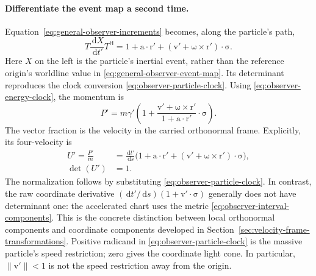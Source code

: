\documentclass[11pt]{article}
\newcommand{\pv}[1]{{#1}}
\newcommand{\vstyle}[1]{{\bm{\mathrm{#1}}}}
\newcommand{\pP}{\pv{P}}
\newcommand{\pT}{\pv{T}}
\newcommand{\pU}{\pv{U}}
\newcommand{\pX}{\pv{X}}
\numberwithin{equation}{section}
\newcommand{\dotprod}{\cdot}
\newcommand{\bsig}{\vstyle{\sigma}}
\newcommand{\br}{\vstyle{r}}
\newcommand{\bv}{\vstyle{v}}
\newcommand{\ba}{\vstyle{a}}
\newcommand{\dd}{\,\mathrm d}
\begin{document}
\paragraph{Differentiate the event map a second time.}
Equation~\eqref{eq:general-observer-increments}
becomes, along the particle's path,
\begin{equation}
 \pT\frac{\dd\pX}{\dd t'}\pT^{\mathsf H}
 =1+\ba\dotprod\br'
  +(\bv'+\vstyle{\omega}\times\br')\dotprod\bsig.
 \label{eq:observer-path-tangent}
\end{equation}
Here $\pX$ on the left is the particle's inertial event, rather than
the reference origin's worldline value in
\eqref{eq:general-observer-event-map}. Its determinant reproduces
the clock conversion \eqref{eq:observer-particle-clock}. Using
\eqref{eq:observer-energy-clock}, the momentum is
\begin{equation}
 \pP'=m\gamma'\left(1+
       \frac{\bv'+\vstyle{\omega}\times\br'}{1+\ba\dotprod\br'}
       \dotprod\bsig\right).
 \label{eq:observer-particle-momentum}
\end{equation}
The vector fraction is the velocity in the carried orthonormal frame.
Explicitly, its four-velocity is
\begin{equation}
 \boxed{\begin{aligned}
 \pU'=\frac{\pP'}{m}
 &=\frac{\dd t'}{\dd s}
 \bigl(1+\ba\dotprod\br'
       +(\bv'+\vstyle{\omega}\times\br')\dotprod\bsig\bigr),\\
 \det(\pU')&=1.
 \end{aligned}}
 \label{eq:observer-particle-four-velocity}
\end{equation}
The normalization follows by substituting
\eqref{eq:observer-particle-clock}. In contrast, the raw coordinate
derivative $(\dd t'/\dd s)(1+\bv'\dotprod\bsig)$ generally does
not have determinant one: the accelerated chart uses the metric
\eqref{eq:observer-interval-components}. This is the concrete
distinction between local orthonormal components and coordinate
components developed in Section~\ref{sec:velocity-frame-transformations}.
Positive radicand in \eqref{eq:observer-particle-clock} is the massive
particle's speed restriction; zero
gives the coordinate light cone. In particular, $\lVert\bv'\rVert<1$
is not the speed restriction away from the origin.
\end{document}
